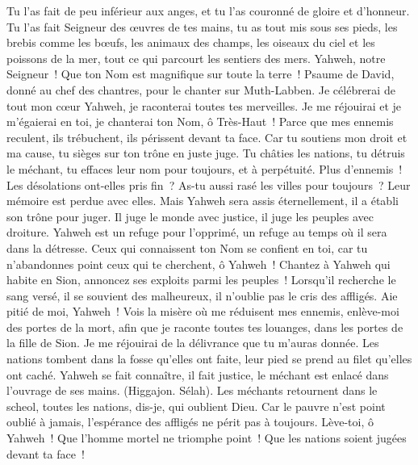 \begin{multicols}{2}
Tu l'as fait de peu inférieur aux anges, et tu l'as couronné de gloire et d'honneur.
Tu l'as fait Seigneur des œuvres de tes mains, tu as tout mis sous ses pieds,
les brebis comme les bœufs, les animaux des champs,
les oiseaux du ciel et les poissons de la mer, tout ce qui parcourt les sentiers des mers.
Yahweh, notre Seigneur~! Que ton Nom est magnifique sur toute la terre~!
\VerseOne{}Psaume de David, donné au chef des chantres, pour le chanter sur Muth-Labben.
Je célébrerai de tout mon cœur Yahweh, je raconterai toutes tes merveilles.
Je me réjouirai et je m'égaierai en toi, je chanterai ton Nom, ô Très-Haut~!
Parce que mes ennemis reculent, ils trébuchent, ils périssent devant ta face.
Car tu soutiens mon droit et ma cause, tu sièges sur ton trône en juste juge.
Tu châties les nations, tu détruis le méchant, tu effaces leur nom pour toujours, et à perpétuité.
Plus d'ennemis~! Les désolations ont-elles pris fin~? As-tu aussi rasé les villes pour toujours~? Leur mémoire est perdue avec elles.
Mais Yahweh sera assis éternellement, il a établi son trône pour juger.
Il juge le monde avec justice, il juge les peuples avec droiture.
Yahweh est un refuge pour l'opprimé, un refuge au temps où il sera dans la détresse.
Ceux qui connaissent ton Nom se confient en toi, car tu n'abandonnes point ceux qui te cherchent, ô Yahweh~!
Chantez à Yahweh qui habite en Sion, annoncez ses exploits parmi les peuples~!
Lorsqu'il recherche le sang versé, il se souvient des malheureux, il n'oublie pas le cris des affligés.
Aie pitié de moi, Yahweh~! Vois la misère où me réduisent mes ennemis, enlève-moi des portes de la mort,
afin que je raconte toutes tes louanges, dans les portes de la fille de Sion. Je me réjouirai de la délivrance que tu m'auras donnée.
Les nations tombent dans la fosse qu'elles ont faite, leur pied se prend au filet qu'elles ont caché.
Yahweh se fait connaître, il fait justice, le méchant est enlacé dans l'ouvrage de ses mains. (Higgajon. Sélah).
Les méchants retournent dans le scheol, toutes les nations, dis-je, qui oublient Dieu.
Car le pauvre n'est point oublié à jamais, l'espérance des affligés ne périt pas à toujours.
Lève-toi, ô Yahweh~! Que l'homme mortel ne triomphe point~! Que les nations soient jugées devant ta face~!

\end{multicols}
